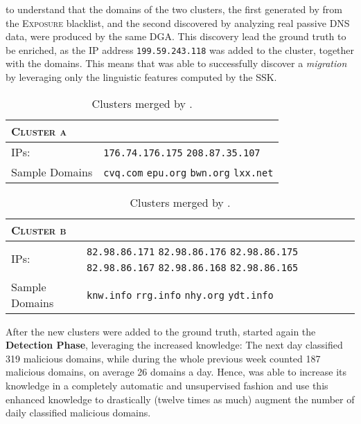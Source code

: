 to understand that the domains of the two clusters, the first generated by \phoenix from the
\textsc{Exposure} blacklist, and the second discovered by \thesystem analyzing
real passive DNS data, were produced by the same DGA. This discovery lead the
ground truth to be enriched, as the IP address \texttt{199.59.243.118} was
added to the cluster, together with the domains. This means that \thesystem was
able to successfully discover a \emph{migration} by leveraging only the
linguistic features computed by the SSK.
\begin{table}[h!tp]
\begin{minipage}{.5\textwidth}
\centering
\begin{tabular}{lp{2.5cm}}
\textsc{Cluster a} & \\
\midrule
IPs:           & \verb+176.74.176.175+ \newline \verb+208.87.35.107+ \newline \newline \newline \newline \\
Sample Domains & \texttt{cvq.com} \newline \texttt{epu.org} \newline \texttt{bwn.org} \newline \texttt{lxx.net} \\
\end{tabular}
\end{minipage}%
\begin{minipage}{.5\textwidth}
\centering
\begin{tabular}{lp{2.5cm}}
\textsc{Cluster b} & \\
\midrule
IPs: & \verb+82.98.86.171+ \newline \verb+82.98.86.176+ \newline \verb+82.98.86.175+
\newline \verb+82.98.86.167+ \newline \verb+82.98.86.168+ \newline
\verb+82.98.86.165+ \\
Sample Domains & \texttt{knw.info} \newline \texttt{rrg.info} \newline \texttt{nhy.org} \newline \texttt{ydt.info} \\
\end{tabular}
\end{minipage}
\caption{Clusters merged by \thesystem.}
\label{tab:merging}
\end{table}
After the new clusters were added to the ground truth, \thesystem started
again the \textbf{Detection Phase}, leveraging the increased knowledge: The next day \thesystem
classified 319 malicious domains, while during the whole previous week counted
187 malicious domains, on average 26 domains a day. Hence, \thesystem was able to increase its knowledge in
a completely automatic and unsupervised fashion and use this enhanced
knowledge to drastically (twelve times as much) augment the number of daily classified malicious domains.
